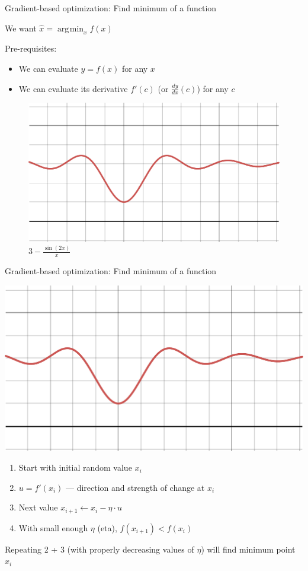 \documentclass[12pt,aspectratio=169]{beamer}
\DeclareMathOperator*{\argmin}{arg\!\min}
\begin{document}
\begin{frame}{Gradient-based optimization: Find minimum of a function}

We want $\hat{x} = \argmin_x f(x)$
	
Pre-requisites:

\begin{itemize}
	\item We can evaluate $y = f(x)$ for any $x$
	\item We can evaluate its derivative $f'(c)$ (or $\frac{dy}{dx}(c)$) for any $c$
\end{itemize}

\begin{figure}
	\includegraphics[width=0.4\linewidth]{img/desmos-graph1.pdf}	
	\caption{$3-\frac{\sin\left(2x\right)}{x}$}
\end{figure}
	
\end{frame}


\begin{frame}{Gradient-based optimization: Find minimum of a function}
	
\includegraphics[width=0.4\linewidth]{img/desmos-graph1.pdf}
	

\begin{enumerate}
	\item Start with initial random value $x_i$
	\item $u = f'(x_i)$ --- direction and strength of change at $x_i$
	\item Next value $x_{i + 1} \gets x_i - \eta \cdot u$
	\item With small enough $\eta$ (eta), $f(x_{i+1}) < f(x_i)$
\end{enumerate}
Repeating 2 + 3 (with properly decreasing values of $\eta$) will find minimum point $x_i$

	
	
\end{frame}
\end{document}

